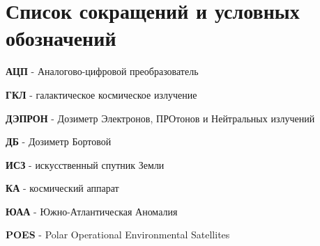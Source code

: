 \chapter*{Список сокращений и условных обозначений}             %

\textbf{АЦП} - Аналогово-цифровой преобразователь

\textbf{ГКЛ} - галактическое космическое излучение

\textbf{ДЭПРОН} - Дозиметр Электронов, ПРОтонов и Нейтральных излучений

\textbf{ДБ} - Дозиметр Бортовой

\textbf{ИСЗ} - искусственный спутник Земли

\textbf{КА} - космический аппарат

\textbf{ЮАА} - Южно-Атлантическая Аномалия



\textbf{POES} - Polar Operational Environmental Satellites